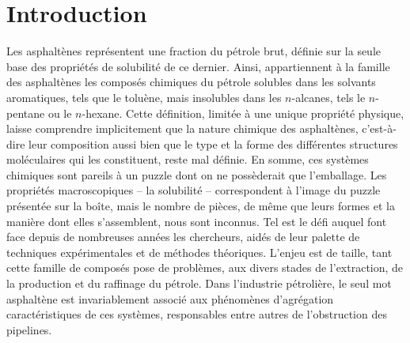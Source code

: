 	\chapter*{Introduction}
	\minitoc
	\restoregeometry
	
	
	Les asphaltènes représentent une fraction du pétrole brut, définie sur la seule base des propriétés de solubilité de ce dernier. Ainsi, appartiennent à la famille des asphaltènes les composés chimiques du pétrole solubles dans les solvants aromatiques, tels que le toluène, mais insolubles dans les $n$-alcanes, tels le $n$-pentane ou le $n$-hexane. Cette définition, limitée à une unique propriété physique, laisse comprendre implicitement que la nature chimique des asphaltènes, c'est-à-dire leur composition aussi bien que le type et la forme des différentes structures moléculaires qui les constituent, reste mal définie. En somme, ces systèmes chimiques sont pareils à un puzzle dont on ne possèderait que l'emballage. Les propriétés macroscopiques -- la solubilité -- correspondent à l'image du puzzle présentée sur la boîte, mais le nombre de pièces, de même que leurs formes et la manière dont elles s'assemblent, nous sont inconnus. Tel est le défi auquel font face depuis de nombreuses années les chercheurs, aidés de leur palette de techniques expérimentales et de méthodes théoriques. L'enjeu est de taille, tant cette famille de composés pose de problèmes, aux divers stades de l'extraction, de la production et du raffinage du pétrole. Dans l'industrie pétrolière, le seul mot \og asphaltène \fg{} est invariablement associé aux phénomènes d'agrégation caractéristiques de ces systèmes, responsables entre autres de l'obstruction des pipelines. \\
	
